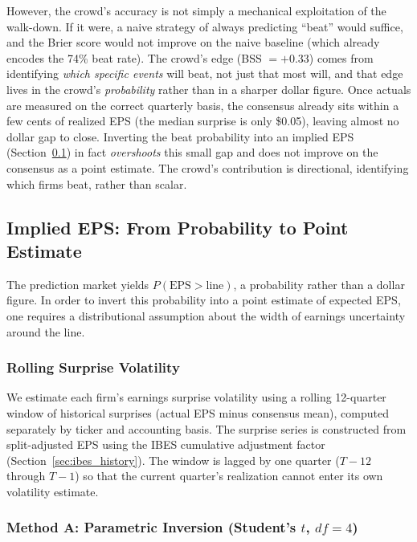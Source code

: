 \documentclass[11pt]{article}
\begin{document}
However, the crowd's accuracy is not simply a mechanical exploitation of the walk-down. If it were, a naive strategy of always predicting ``beat'' would suffice, and the Brier score would not improve on the naive baseline (which already encodes the 74\% beat rate). The crowd's edge (BSS $= +0.33$) comes from identifying \textit{which specific events} will beat, not just that most will, and that edge lives in the crowd's \textit{probability} rather than in a sharper dollar figure. Once actuals are measured on the correct quarterly basis, the consensus already sits within a few cents of realized EPS (the median surprise is only \$0.05), leaving almost no dollar gap to close. Inverting the beat probability into an implied EPS (Section~\ref{sec:implied}) in fact \textit{overshoots} this small gap and does not improve on the consensus as a point estimate. The crowd's contribution is directional, identifying which firms beat, rather than scalar.

\subsection{Implied EPS: From Probability to Point Estimate} \label{sec:implied}

The prediction market yields $P(\text{EPS} > \text{line})$, a probability rather than a dollar figure. In order to invert this probability into a point estimate of expected EPS, one requires a distributional assumption about the width of earnings uncertainty around the line.

\subsubsection{Rolling Surprise Volatility}

We estimate each firm's earnings surprise volatility using a rolling 12-quarter window of historical surprises (actual EPS minus consensus mean), computed separately by ticker and accounting basis. The surprise series is constructed from split-adjusted EPS using the IBES cumulative adjustment factor (Section~\ref{sec:ibes_history}). The window is lagged by one quarter ($T-12$ through $T-1$) so that the current quarter's realization cannot enter its own volatility estimate.

\subsubsection{Method A: Parametric Inversion (Student's $t$, $df=4$)}
\end{document}

